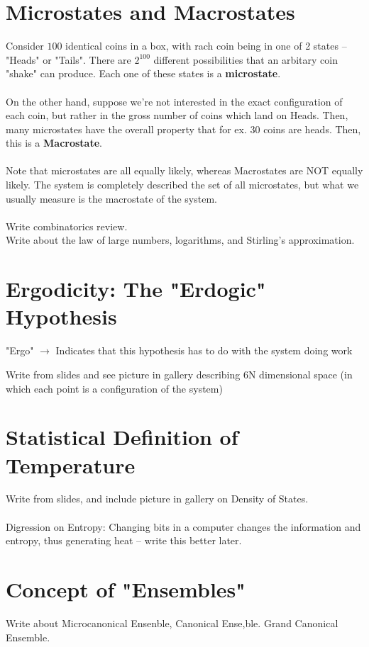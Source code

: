 \documentclass[twoside]{article}
\begin{document}
\section{Microstates and Macrostates}

Consider $100$ identical coins in a box, with rach coin being in one of 2 states -- "Heads" or "Tails". There are $2^{100}$ different possibilities that an arbitary coin "shake" can produce. Each one of these states is a \textbf{microstate}.
\\
\\
On the other hand, suppose we're not interested in the exact configuration of each coin, but rather in the gross number of coins which land on Heads. Then, many microstates have the overall property that for ex. 30 coins are heads. Then, this is a \textbf{Macrostate}.
\\
\\
Note that microstates are all equally likely, whereas Macrostates are NOT equally likely. The system is completely described the set of all microstates, but what we usually measure is the macrostate of the system.
\\
\\
Write combinatorics review.
\\
Write about the law of large numbers, logarithms, and Stirling's approximation.

\section{Ergodicity: The "Erdogic" Hypothesis}
"Ergo" $\rightarrow$  Indicates that this hypothesis has to do with the system doing work

Write from slides and see picture in gallery describing 6N dimensional space (in which each point is a configuration of the system)

\section{Statistical Definition of Temperature}
Write from slides, and include picture in gallery on Density of States.
\\
\\
Digression on Entropy:
Changing bits in a computer changes the information and entropy, thus generating heat -- write this better later.

\section{Concept of "Ensembles"}
Write about Microcanonical Ensenble, Canonical Ense,ble. Grand Canonical Ensemble.
\end{document}
